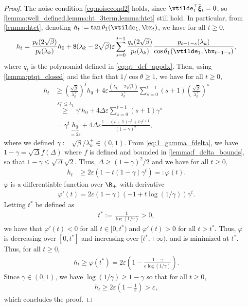 \documentclass{article}
\theoremstyle{plain}
\theoremstyle{definition}
\theoremstyle{remark}
\begin{document}
\begin{proof}
  The noise condition \eqref{eq:noisecond2} holds, since $\vtilde_1^\top\tilde{\boldsymbol{\xi}}_t = 0$, so \cref{lemma:well_defined,lemma:ht_3term,lemma:htct} still hold. In particular, from \cref{lemma:htct}, denoting $h_t := \tan \theta_1(\vtilde_1, \bx_t)$, we have for all $t\geqslant 0$,
  \begin{align*}
    h_t = \frac{p_t(2\sqrt{\beta})}{p_t(\lambda_k)}h_0 + 8(\lambda_k-2\sqrt{\beta})\varepsilon\sum_{s=0}^{t-1} \frac{q_s(2\sqrt{\beta})}{p_t(\lambda_k)} \frac{p_{t-1-s}(\lambda_k)}{\cos\theta_1(\vtilde_1, \bx_{t-1-s})},
  \end{align*}
  where $q_t$ is the polynomial defined in \eqref{eq:qt_def_appdx}. Then, using \cref{lemma:ptqt_closed} and the fact that $1/\cos\theta\geqslant 1$, we have for all $t\geqslant 0$,
  \begin{align*}
    h_t & \geqslant \left(\frac{\sqrt{\beta}}{\lambda_k^+}\right)^t h_0 + 4\varepsilon\frac{(\lambda_k-2\sqrt{\beta})}{\lambda_k^+}\sum_{s=0}^{t-1}(s+1)\left(\frac{\sqrt{\beta}}{\lambda_k^+}\right)^s \\
    & \stackrel{\lambda_k^+\leqslant\lambda_k}{\geqslant} \gamma^th_0 +  4\Delta\varepsilon \sum_{s=0}^{t-1} (s+1) \gamma^s \\
    & = \gamma^t \underbrace{h_0}_{=2\varepsilon} + 4\Delta\varepsilon \frac{1 - (t+1)\gamma^t + t\gamma^{t+1}}{(1-\gamma)^2},
  \end{align*}
  where we defined $\gamma := \sqrt{\beta}/\lambda_k^+ \in (0,1)$. From \eqref{eq:1_gamma_fdelta}, we have $1-\gamma = \sqrt{\Delta} f(\Delta)$ where $f$ is defined and bounded in \cref{lemma:f_delta_bounds}, so that $1-\gamma \leqslant \sqrt{\Delta} \sqrt{2}$. Thus, $\Delta \geqslant (1-\gamma)^2/2$ and we have for all $t\geqslant 0$,
  \begin{align*}
    h_t & \geqslant  2\varepsilon \left(1 - t(1-\gamma)\gamma^t\right) =: \varphi(t).
  \end{align*}
  $\varphi$ is a differentiable function over $\R_+$ with derivative
  \begin{align*}
    \varphi'(t) = 2\varepsilon(1-\gamma) (-1 + t\log(1/\gamma))\gamma^t.
  \end{align*}
  Letting $t^*$ be defined as
  \begin{align*}
    t^* := \frac{1}{\log(1/\gamma)} > 0,
  \end{align*}
  we have that $\varphi'(t) < 0$ for all $t \in [0,t^*)$ and $\varphi'(t) > 0$ for all $t > t^*$. Thus, $\varphi$ is decreasing over $[0,t^*]$ and increasing over $[t^*,+\infty)$, and is minimized at $t^*$. Thus, for all $t\geqslant 0$,
  \begin{align*}
    h_t \geqslant \varphi(t^*) = 2\varepsilon \left(1 - \frac{1-\gamma}{e \log(1/\gamma)}\right).
  \end{align*}
  Since $\gamma \in (0,1)$, we have $\log(1/\gamma) \geqslant 1-\gamma$ so that for all $t\geqslant 0$,
  \begin{align*}
    h_t \geqslant 2\varepsilon \left(1 - \frac{1}{e}\right) > \varepsilon,
  \end{align*}
  which concludes the proof.
\end{proof}
\end{document}
